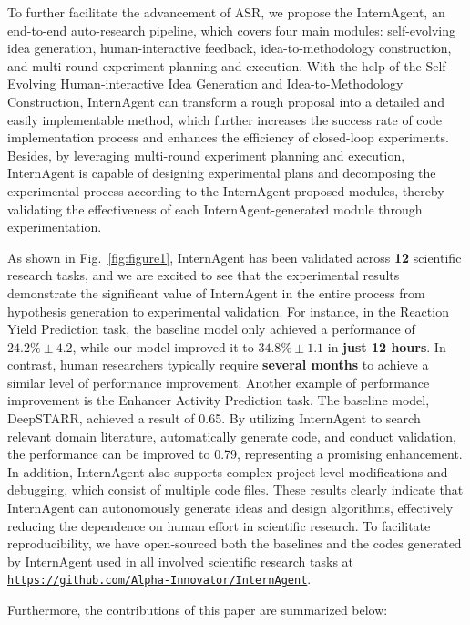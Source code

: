 To further facilitate the advancement of ASR, we propose the InternAgent, an end-to-end auto-research pipeline, which covers four main modules: self-evolving idea generation, human-interactive feedback, idea-to-methodology construction, and multi-round experiment planning and execution. With the help of the Self-Evolving Human-interactive Idea Generation and Idea-to-Methodology Construction, InternAgent can transform a rough proposal into a detailed and easily implementable method, which further increases the success rate of code implementation process and enhances the efficiency of closed-loop experiments. Besides, by leveraging multi-round experiment planning and execution, InternAgent is capable of designing experimental plans and decomposing the experimental process according to the InternAgent-proposed modules, thereby validating the effectiveness of each InternAgent-generated module through experimentation. 

As shown in Fig.~\ref{fig:figure1}, InternAgent has been validated across \textbf{12} scientific research tasks, and we are excited to see that the experimental results demonstrate the significant value of InternAgent in the entire process from hypothesis generation to experimental validation. For instance, in the Reaction Yield Prediction task, the baseline model only achieved a performance of $24.2\%\pm4.2$, while our model improved it to $34.8\%\pm1.1$ in \textbf{just 12 hours}. In contrast, human researchers typically require \textbf{several months} to achieve a similar level of performance improvement. Another example of performance improvement is the Enhancer Activity Prediction task. The baseline model, DeepSTARR, achieved a result of 0.65. By utilizing InternAgent to search relevant domain literature, automatically generate code, and conduct validation, the performance can be improved to 0.79, representing a promising enhancement. In addition, InternAgent also supports complex project-level modifications and debugging, which consist of multiple code files. These results clearly indicate that InternAgent can autonomously generate ideas and design algorithms, effectively reducing the dependence on human effort in scientific research. To facilitate reproducibility, we have open-sourced both the baselines and the codes generated by InternAgent used in all involved scientific research tasks at \texttt{\url{https://github.com/Alpha-Innovator/InternAgent}}.

Furthermore, the contributions of this paper are summarized below:

